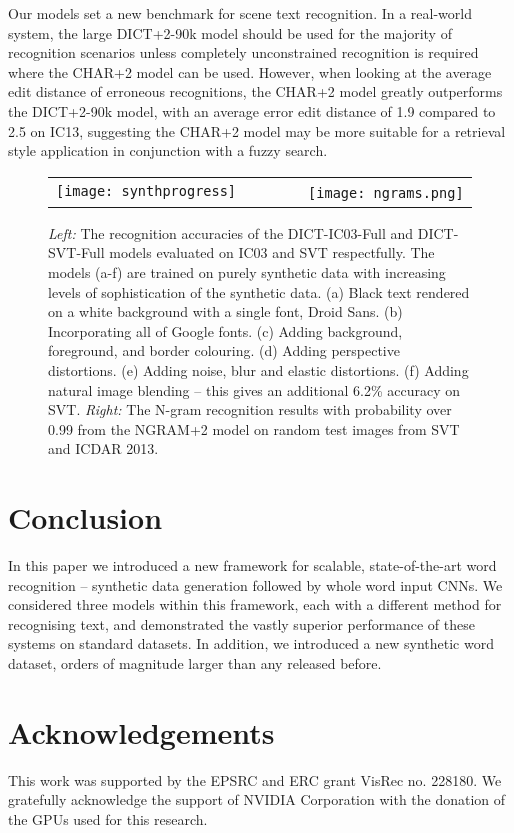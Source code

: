 \documentclass{article} \usepackage{nips14submit_e,times}
\begin{document}
Our models set a new benchmark for scene text recognition. In a real-world system, the large DICT+2-90k model should be used for the majority of recognition scenarios unless completely unconstrained recognition is required where the CHAR+2 model can be used. However, when looking at the average edit distance of erroneous recognitions, the CHAR+2 model greatly outperforms the DICT+2-90k model, with an average error edit distance of 1.9 compared to 2.5 on IC13, suggesting the CHAR+2 model may be more suitable for a retrieval style application in conjunction with a fuzzy search.



\begin{figure}[t]
\begin{center}
\begin{tabular}{cc}
\texttt{[image: synthprogress]}&
~~~~~~~\texttt{[image: ngrams.png]}
\end{tabular}
\end{center}
\caption{\small \emph{Left:} The recognition accuracies of the DICT-IC03-Full and DICT-SVT-Full models evaluated on IC03 and SVT respectfully. The models (a-f) are trained on purely synthetic data with increasing levels of sophistication of the synthetic data. (a) Black text rendered on a white background with a single font, Droid Sans. (b) Incorporating all of Google fonts. (c) Adding background, foreground, and border colouring. (d) Adding perspective distortions. (e) Adding noise, blur and elastic distortions. (f) Adding natural image blending -- this gives an additional 6.2\% accuracy on SVT. \emph{Right:} The N-gram recognition results with probability over 0.99 from the NGRAM+2 model on random test images from SVT and ICDAR 2013.}
\vspace{0.5cm}
\label{fig:ngramresults}
\end{figure}

\section{Conclusion}\label{sec:conclusions}
In this paper we introduced a new framework for scalable, state-of-the-art word recognition -- synthetic data generation followed by whole word input CNNs. We considered three models within this framework, each with a different method for recognising text, and demonstrated the vastly superior performance of these systems on standard datasets. In addition, we introduced a new synthetic word dataset, orders of magnitude larger than any released before. 


\section*{Acknowledgements}
This work was supported by the EPSRC and ERC grant VisRec no. 228180. We gratefully acknowledge the support
of NVIDIA Corporation with the donation of the GPUs used for this research.


{
\small

}
\end{document}
